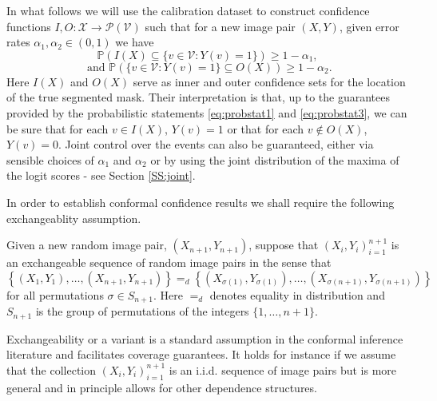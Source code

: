 In what follows we will use the calibration dataset to construct confidence functions $I,O:  \mathcal{X}  \rightarrow \mathcal{P}(\mathcal{V})$ such that for a new image pair $(X,Y)$, given error rates $\alpha_1, \alpha_2 \in (0,1)$ we have
\begin{equation}\label{eq:probstat1}
	\mathbb{P}\left( I(X) \subseteq \lbrace v\in \mathcal{V}: Y(v) = 1 \rbrace  \right) \geq 1 - \alpha_1, 
\end{equation}
\begin{equation}\label{eq:probstat3}
	\text{ and } 	\mathbb{P}\left( \lbrace v\in \mathcal{V}: Y(v) = 1 \rbrace \subseteq O(X)  \right) \geq 1 - \alpha_2.
\end{equation}
Here $I(X)$ and $O(X)$ serve as inner and outer confidence sets for the location of the true segmented mask. Their interpretation is that, up to the guarantees provided by the probabilistic statements \eqref{eq:probstat1} and \eqref{eq:probstat3}, we can be sure that for each $v\in I(X)$, $Y(v) = 1$ or that for each $v \not\in O(X)$, $Y(v) = 0$. Joint control over the events can also be guaranteed, either via sensible choices of $\alpha_1$ and $\alpha_2$ or by using the joint distribution of the maxima of the logit scores - see Section \ref{SS:joint}. 

In order to establish conformal confidence results we shall require the following exchangeablity assumption. 
\begin{assumption}\label{ass:ex}
		Given a new random image pair, $(X_{n+1},Y_{n+1})$, suppose that $(X_i, Y_i)_{i = 1}^{n+1}$ is an exchangeable sequence of random image pairs in the sense that 
	\begin{equation*}
		\left\lbrace (X_1,Y_1), \dots, (X_{n+1}, Y_{n+1}) \right\rbrace =_d \left\lbrace (X_{\sigma(1)}, Y_{\sigma(1)}), \dots, (X_{\sigma(n+1)}, Y_{\sigma(n+1)}) \right\rbrace
	\end{equation*}
	for all permutations $\sigma \in S_{n+1}$. Here $=_d$ denotes equality in distribution and $S_{n+1} $ is the group of permutations of the integers $\lbrace1, \dots, n+1\rbrace$.
\end{assumption}
Exchangeability or a variant is a standard assumption in the conformal inference literature \citep{Angelopoulos2021} and facilitates coverage guarantees. It holds for instance if we assume that the collection $(X_i, Y_i)_{i = 1}^{n+1}$ is an i.i.d. sequence of image pairs but is more general and in principle allows for other dependence structures. 

